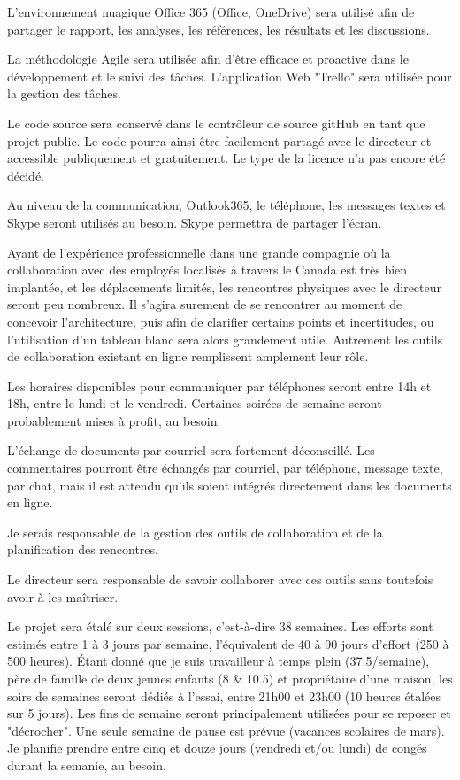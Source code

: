 \vspace{\baselineskip}
\par L’environnement nuagique Office 365 (Office, OneDrive) sera utilisé afin de partager le rapport, les analyses, les références, les résultats et les discussions.
\par La méthodologie Agile sera utilisée afin d’être efficace et proactive dans le développement et le suivi des tâches. L’application Web "Trello" sera utilisée pour la gestion des tâches. 
\par Le code source sera conservé dans le contrôleur de source gitHub en tant que projet public. Le code pourra ainsi être facilement partagé avec le directeur et accessible publiquement et gratuitement. Le type de la licence n'a pas encore été décidé. 
\par Au niveau de la communication, Outlook365, le téléphone, les messages textes et Skype seront utilisés au besoin. Skype permettra de partager l’écran. 
\par Ayant de l’expérience professionnelle dans une grande compagnie où la collaboration avec des employés localisés à travers le Canada est très bien implantée, et les déplacements limités, les rencontres physiques avec le directeur seront peu nombreux. Il s’agira surement de se rencontrer au moment de concevoir l’architecture, puis afin de clarifier certains points et incertitudes, ou l’utilisation d’un tableau blanc sera alors grandement utile. Autrement les outils de collaboration existant en ligne remplissent amplement leur rôle.
\par Les horaires disponibles pour communiquer par téléphones seront entre 14h et 18h, entre le lundi et le vendredi. Certaines soirées de semaine seront probablement mises à profit, au besoin. 
\par L’échange de documents par courriel sera fortement déconseillé. Les commentaires pourront être échangés par courriel, par téléphone, message texte, par chat, mais il est attendu qu’ils soient intégrés directement dans les documents en ligne.
\par Je serais responsable de la gestion des outils de collaboration et de la planification des rencontres.
\par Le directeur sera responsable de savoir collaborer avec ces outils sans toutefois avoir à les maîtriser. 
\par Le projet sera étalé sur deux sessions, c’est-à-dire 38 semaines. Les efforts sont estimés entre 1 à 3 jours par semaine, l'équivalent de 40 à 90 jours d’effort (250 à 500 heures). Étant donné que je suis travailleur à temps plein (37.5/semaine), père de famille de deux jeunes enfants (8 \& 10.5) et propriétaire d’une maison, les soirs de semaines seront dédiés à l’essai, entre 21h00 et 23h00 (10 heures étalées sur 5 jours). Les fins de semaine seront principalement utilisées pour se reposer et "décrocher". Une seule semaine de pause est prévue (vacances scolaires de mars). Je planifie prendre entre cinq et douze jours (vendredi et/ou lundi) de congés durant la semanie, au besoin.
